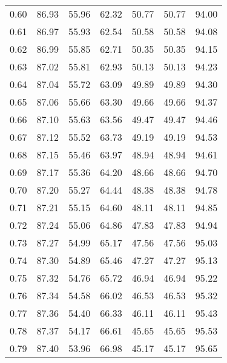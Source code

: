 \begin{tabular}{|c|c|c|c|c|c|c|}
      0.60 &     86.93 &     55.96 &      62.32 &   50.77 &      50.77 &         94.00 \\
      0.61 &     86.97 &     55.93 &      62.54 &   50.58 &      50.58 &         94.08 \\
      0.62 &     86.99 &     55.85 &      62.71 &   50.35 &      50.35 &         94.15 \\
      0.63 &     87.02 &     55.81 &      62.93 &   50.13 &      50.13 &         94.23 \\
      0.64 &     87.04 &     55.72 &      63.09 &   49.89 &      49.89 &         94.30 \\
      0.65 &     87.06 &     55.66 &      63.30 &   49.66 &      49.66 &         94.37 \\
      0.66 &     87.10 &     55.63 &      63.56 &   49.47 &      49.47 &         94.46 \\
      0.67 &     87.12 &     55.52 &      63.73 &   49.19 &      49.19 &         94.53 \\
      0.68 &     87.15 &     55.46 &      63.97 &   48.94 &      48.94 &         94.61 \\
      0.69 &     87.17 &     55.36 &      64.20 &   48.66 &      48.66 &         94.70 \\
      0.70 &     87.20 &     55.27 &      64.44 &   48.38 &      48.38 &         94.78 \\
      0.71 &     87.21 &     55.15 &      64.60 &   48.11 &      48.11 &         94.85 \\
      0.72 &     87.24 &     55.06 &      64.86 &   47.83 &      47.83 &         94.94 \\
      0.73 &     87.27 &     54.99 &      65.17 &   47.56 &      47.56 &         95.03 \\
      0.74 &     87.30 &     54.89 &      65.46 &   47.27 &      47.27 &         95.13 \\
      0.75 &     87.32 &     54.76 &      65.72 &   46.94 &      46.94 &         95.22 \\
      0.76 &     87.34 &     54.58 &      66.02 &   46.53 &      46.53 &         95.32 \\
      0.77 &     87.36 &     54.40 &      66.33 &   46.11 &      46.11 &         95.43 \\
      0.78 &     87.37 &     54.17 &      66.61 &   45.65 &      45.65 &         95.53 \\
      0.79 &     87.40 &     53.96 &      66.98 &   45.17 &      45.17 &         95.65 \\

\end{tabular}
